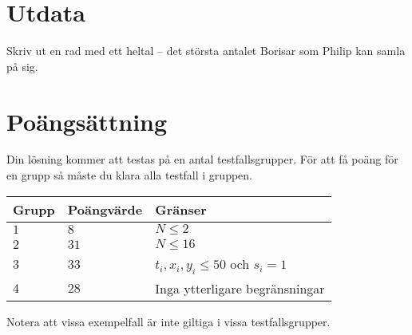 \section*{Utdata}
Skriv ut en rad med ett heltal -- det största antalet Borisar som Philip kan samla på sig.

\section*{Poängsättning}
Din lösning kommer att testas på en antal testfallsgrupper.
För att få poäng för en grupp så måste du klara alla testfall i gruppen.

\noindent
\begin{tabular}{| l | l | l |}
  \hline
  Grupp & Poängvärde & Gränser \\ \hline
  $1$   & $8$        & $N \le 2$ \\ \hline
  $2$   & $31$       & $N \le 16$ \\ \hline
  $3$   & $33$       & $t_{i},x_{i},y_{i}\le 50$ och $s_{i} = 1$ \\ \hline
  $4$   & $28$       & Inga ytterligare begränsningar \\ \hline
\end{tabular}

Notera att vissa exempelfall är inte giltiga i vissa testfallsgrupper.

